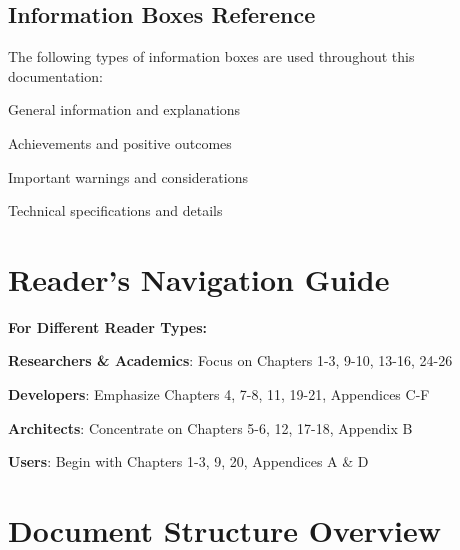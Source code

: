 \subsection*{Information Boxes Reference}
The following types of information boxes are used throughout this documentation:

\begin{description}[leftmargin=3cm,labelwidth=2.5cm]
    \item[\textbf{Info Boxes}] \colorbox{blue!20}{General information and explanations}
    \item[\textbf{Success Boxes}] \colorbox{green!20}{Achievements and positive outcomes}
    \item[\textbf{Alert Boxes}] \colorbox{orange!20}{Important warnings and considerations}
    \item[\textbf{Technical Boxes}] \colorbox{purple!20}{Technical specifications and details}
\end{description}

\section*{Reader's Navigation Guide}

\begin{successbox}
\textbf{For Different Reader Types:}
\begin{compactlist}
    \item \textbf{Researchers \& Academics}: Focus on Chapters 1-3, 9-10, 13-16, 24-26
    \item \textbf{Developers}: Emphasize Chapters 4, 7-8, 11, 19-21, Appendices C-F
    \item \textbf{Architects}: Concentrate on Chapters 5-6, 12, 17-18, Appendix B
    \item \textbf{Users}: Begin with Chapters 1-3, 9, 20, Appendices A \& D
\end{compactlist}
\end{successbox}

\section*{Document Structure Overview}

